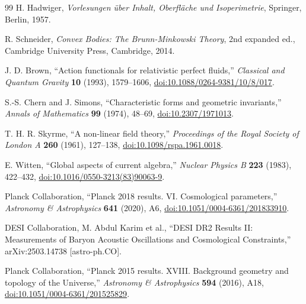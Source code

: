 \documentclass[11pt,a4paper]{article}
\numberwithin{equation}{section}
\theoremstyle{remark}
\begin{document}
\begin{thebibliography}{99}
H. Hadwiger, \emph{Vorlesungen \"uber Inhalt, Oberfl\"ache und Isoperimetrie}, Springer, Berlin, 1957.

R. Schneider, \emph{Convex Bodies: The Brunn-Minkowski Theory}, 2nd expanded ed., Cambridge University Press, Cambridge, 2014.

J. D. Brown, ``Action functionals for relativistic perfect fluids,'' \emph{Classical and Quantum Gravity} \textbf{10} (1993), 1579--1606, \href{https://doi.org/10.1088/0264-9381/10/8/017}{doi:10.1088/0264-9381/10/8/017}.

S.-S. Chern and J. Simons, ``Characteristic forms and geometric invariants,'' \emph{Annals of Mathematics} \textbf{99} (1974), 48--69, \href{https://doi.org/10.2307/1971013}{doi:10.2307/1971013}.

T. H. R. Skyrme, ``A non-linear field theory,'' \emph{Proceedings of the Royal Society of London A} \textbf{260} (1961), 127--138, \href{https://doi.org/10.1098/rspa.1961.0018}{doi:10.1098/rspa.1961.0018}.

E. Witten, ``Global aspects of current algebra,'' \emph{Nuclear Physics B} \textbf{223} (1983), 422--432, \href{https://doi.org/10.1016/0550-3213(83)90063-9}{doi:10.1016/0550-3213(83)90063-9}.

Planck Collaboration, ``Planck 2018 results. VI. Cosmological parameters,'' \emph{Astronomy \& Astrophysics} \textbf{641} (2020), A6, \href{https://doi.org/10.1051/0004-6361/201833910}{doi:10.1051/0004-6361/201833910}.

DESI Collaboration, M. Abdul Karim et al., ``DESI DR2 Results II: Measurements of Baryon Acoustic Oscillations and Cosmological Constraints,'' arXiv:2503.14738 [astro-ph.CO].

Planck Collaboration, ``Planck 2015 results. XVIII. Background geometry and topology of the Universe,'' \emph{Astronomy \& Astrophysics} \textbf{594} (2016), A18, \href{https://doi.org/10.1051/0004-6361/201525829}{doi:10.1051/0004-6361/201525829}.

\end{thebibliography}
\end{document}
